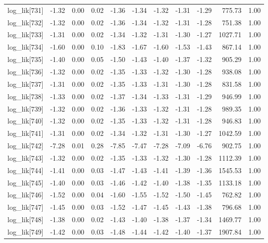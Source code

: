 \begin{table}[ht]
\begin{tabular}{rrrrrrrrrrr}
  log\_lik[731] & -1.32 & 0.00 & 0.02 & -1.36 & -1.34 & -1.32 & -1.31 & -1.29 & 775.73 & 1.00 \\ 
  log\_lik[732] & -1.32 & 0.00 & 0.02 & -1.36 & -1.34 & -1.32 & -1.31 & -1.28 & 751.38 & 1.00 \\ 
  log\_lik[733] & -1.31 & 0.00 & 0.02 & -1.34 & -1.32 & -1.31 & -1.30 & -1.27 & 1027.71 & 1.00 \\ 
  log\_lik[734] & -1.60 & 0.00 & 0.10 & -1.83 & -1.67 & -1.60 & -1.53 & -1.43 & 867.14 & 1.00 \\ 
  log\_lik[735] & -1.40 & 0.00 & 0.05 & -1.50 & -1.43 & -1.40 & -1.37 & -1.32 & 905.29 & 1.00 \\ 
  log\_lik[736] & -1.32 & 0.00 & 0.02 & -1.35 & -1.33 & -1.32 & -1.30 & -1.28 & 938.08 & 1.00 \\ 
  log\_lik[737] & -1.31 & 0.00 & 0.02 & -1.35 & -1.33 & -1.31 & -1.30 & -1.28 & 831.58 & 1.00 \\ 
  log\_lik[738] & -1.33 & 0.00 & 0.02 & -1.37 & -1.34 & -1.33 & -1.31 & -1.29 & 946.99 & 1.00 \\ 
  log\_lik[739] & -1.32 & 0.00 & 0.02 & -1.36 & -1.33 & -1.32 & -1.31 & -1.28 & 989.35 & 1.00 \\ 
  log\_lik[740] & -1.32 & 0.00 & 0.02 & -1.35 & -1.33 & -1.32 & -1.31 & -1.28 & 946.83 & 1.00 \\ 
  log\_lik[741] & -1.31 & 0.00 & 0.02 & -1.34 & -1.32 & -1.31 & -1.30 & -1.27 & 1042.59 & 1.00 \\ 
  log\_lik[742] & -7.28 & 0.01 & 0.28 & -7.85 & -7.47 & -7.28 & -7.09 & -6.76 & 902.75 & 1.00 \\ 
  log\_lik[743] & -1.32 & 0.00 & 0.02 & -1.35 & -1.33 & -1.32 & -1.30 & -1.28 & 1112.39 & 1.00 \\ 
  log\_lik[744] & -1.41 & 0.00 & 0.03 & -1.47 & -1.43 & -1.41 & -1.39 & -1.36 & 1545.53 & 1.00 \\ 
  log\_lik[745] & -1.40 & 0.00 & 0.03 & -1.46 & -1.42 & -1.40 & -1.38 & -1.35 & 1133.18 & 1.00 \\ 
  log\_lik[746] & -1.52 & 0.00 & 0.04 & -1.60 & -1.55 & -1.52 & -1.50 & -1.45 & 762.82 & 1.00 \\ 
  log\_lik[747] & -1.45 & 0.00 & 0.03 & -1.52 & -1.47 & -1.45 & -1.43 & -1.38 & 796.68 & 1.00 \\ 
  log\_lik[748] & -1.38 & 0.00 & 0.02 & -1.43 & -1.40 & -1.38 & -1.37 & -1.34 & 1469.77 & 1.00 \\ 
  log\_lik[749] & -1.42 & 0.00 & 0.03 & -1.48 & -1.44 & -1.42 & -1.40 & -1.37 & 1907.84 & 1.00 \\ 

\end{tabular}
\end{table}
